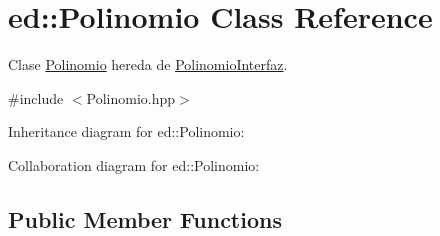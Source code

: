 \hypertarget{classed_1_1Polinomio}{}\section{ed\+:\+:Polinomio Class Reference}
\label{classed_1_1Polinomio}


Clase \hyperlink{classed_1_1Polinomio}{Polinomio} hereda de \hyperlink{classed_1_1PolinomioInterfaz}{Polinomio\+Interfaz}.  




{\ttfamily \#include $<$Polinomio.\+hpp$>$}



Inheritance diagram for ed\+:\+:Polinomio\+:


Collaboration diagram for ed\+:\+:Polinomio\+:
\subsection*{Public Member Functions}
